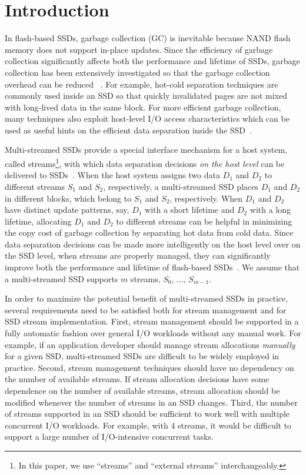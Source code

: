 \section{Introduction}
\label{sec:intro}
In flash-based SSDs, garbage collection (GC) is inevitable because NAND flash 
memory does not support in-place updates.  
Since the efficiency of garbage collection significantly affects  
both the performance and lifetime of SSDs, garbage collection has been extensively 
investigated so that the garbage collection overhead can be reduced
~\cite{DAC, WriteAmplification, GCGreedy, GCVictim, GCTTFlash, HotCold}.  
For example, hot-cold separation techniques are commonly used inside an SSD 
so that quickly invalidated pages are not mixed with long-lived data in the same block.   
For more efficient garbage collection, many techniques also exploit
host-level I/O access characteristics which can be used as useful hints on 
the efficient data separation inside the SSD~\cite{JiTGC, ShadowGC}.

Multi-streamed SSDs provide a special interface mechanism for 
a host system, called streams\footnote{In this paper, we use ``streams''
and ``external streams'' interchangeably.},
with which data separation decisions 
{\it on the host level} can be delivered to SSDs~\cite{T10, MultiStream}.  
When the host system assigns two data $D_1$ and $D_2$ to 
different streams $S_1$ and $S_2$, respectively, a multi-streamed SSD 
places $D_1$ and $D_2$ in different blocks, which belong to $S_1$ and $S_2$, respectively.
When $D_1$ and $D_2$ have distinct update patterns, say, $D_1$ with a short lifetime 
and $D_2$ with a long lifetime, allocating $D_1$ and $D_2$ to different streams 
can be helpful in minimizing the copy cost of
garbage collection by separating hot data from cold data.  
Since data separation decisions can be made more intelligently on the host level over on the SSD level, 
when streams are properly managed, they can significantly
improve both the performance and lifetime of 
flash-based SSDs~\cite{MultiStream, Level, FStream, vStream, AutoStream}.
We assume that a multi-streamed SSD supports $m$ streams, $S_0$, ..., $S_{m-1}$.

In order to maximize the potential benefit of multi-streamed
SSDs in practice, several requirements need to be satisfied both for 
stream management and for SSD stream implementation.
First, stream management should be supported in a fully automatic fashion 
over general I/O workloads without any manual work.
For example, if an
application developer should manage stream allocations {\it manually} for 
a given SSD, multi-streamed SSDs are difficult to be 
widely employed in practice.   
Second, stream management techniques should have no dependency on 
the number of available streams.  
If stream allocation decisions have some dependence on
the number of available streams,  
stream allocation should be modified
whenever the number of streams in an SSD changes.
Third, the number of streams supported in an SSD should be sufficient 
to work well with multiple concurrent I/O workloads.  
For example, with 4 streams, it would be difficult to support a large
number of I/O-intensive concurrent tasks.  

